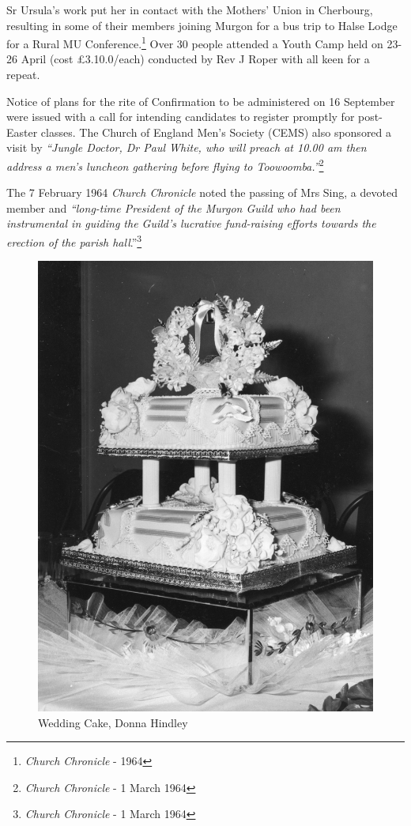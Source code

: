 Sr Ursula's work put her in contact with the Mothers' Union in Cherbourg, resulting in some of their members joining Murgon for a bus trip to Halse Lodge for a Rural MU Conference.\footnote{\emph{Church Chronicle} - 1964} Over 30 people attended a Youth Camp held on 23-26 April (cost \pounds3.10.0/each) conducted by Rev J Roper with all keen for a repeat.


Notice of plans for the rite of Confirmation to be administered on 16 September were issued with a call for intending candidates to register promptly for post-Easter classes. The Church of England Men's Society (CEMS) also sponsored a visit by \emph{``Jungle Doctor, Dr Paul White, who will preach at 10.00 am then address a men's luncheon gathering before flying to Toowoomba.''}\footnote{\emph{Church Chronicle} - 1 March 1964}


The 7 February 1964 \emph{Church Chronicle} noted the passing of Mrs Sing, a devoted member and \emph{``long-time President of the Murgon Guild who had been instrumental in guiding the Guild's lucrative fund-raising efforts towards the erection of the parish hall}.''\footnote{\emph{Church Chronicle} - 1 March 1964}








\begin{figure}
\begin{center}
\includegraphics[width=.5\linewidth,center]{../images/donnaWeddingCake.jpg}
\caption{Wedding Cake, Donna Hindley}
\end{center}
\end{figure}




